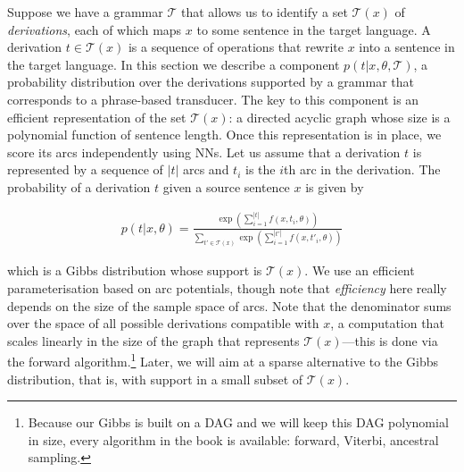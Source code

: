 Suppose we have a grammar $\mathcal T$ that allows us to identify a
set $\mathcal T(x)$ of \emph{derivations}, each of which maps $x$ to
some sentence in the target language. A derivation $t \in \mathcal
    T(x)$ is a sequence of operations that rewrite $x$ into a sentence in
the target language. In this section we describe a component $p(t|x,
    \theta, \mathcal T)$, a probability distribution over the derivations
supported by a grammar that corresponds to a phrase-based transducer.
The key to this component is an efficient representation of the set
$\mathcal T(x)$: a directed acyclic graph whose size is a polynomial
function of sentence length. Once this representation is in place, we
score its arcs independently using NNs. Let us assume that a
derivation $t$ is represented by a sequence of $|t|$ arcs and $t_i$
is the $i$th arc in the derivation. The probability of a derivation
$t$ given a source sentence $x$ is given by

\begin{align}
    p(t|x, \theta) =
    \frac
    {\exp(\sum_{i=1}^{|t|} f(x, t_i, \theta))}
    {\sum_{t' \in \mathcal T(x)}
        \exp(\sum_{i=1}^{|t'|} f(x, t'_i, \theta))
    }
\end{align}

\noindent which is a Gibbs distribution whose support is $\mathcal
    T(x)$. We use an efficient parameterisation based on arc potentials,
though note that \emph{efficiency} here really depends on the size of
the sample space of arcs. Note that the denominator sums over the
space of all possible derivations compatible with $x$, a computation
that scales linearly in the size of the graph that represents
$\mathcal T(x)$---this is done via the forward
algorithm.\footnote{Because our Gibbs is built on a DAG and we will
    keep this DAG polynomial in size, every algorithm in the book is
    available: forward, Viterbi, ancestral sampling.} Later, we
will aim at a sparse alternative to the Gibbs distribution, that is,
with support in a small subset of $\mathcal T(x)$.


